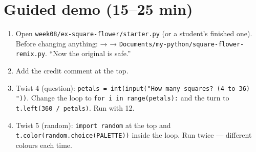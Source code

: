 \section{Guided demo (15--25 min)}
\begin{workedexample}
\begin{enumerate}[leftmargin=1.4em,itemsep=1pt]
  \item Open \texttt{week08/ex-square-flower/starter.py} (or a student's finished one). Before changing anything:  →  → \texttt{Documents/my-python/square-flower-remix.py}. \enquote{Now the original is safe.}
  \item Add the credit comment at the top.
  \item Twist 4 (question): \texttt{petals = int(input("How many squares? (4 to 36) "))}. Change the loop to \texttt{for i in range(petals):} and the turn to \texttt{t.left(360 / petals)}. Run with 12.
  \item Twist 5 (random): \texttt{import random} at the top and \texttt{t.color(random.choice(PALETTE))} inside the loop. Run twice --- different colours each time.
\end{enumerate}
\end{workedexample}

